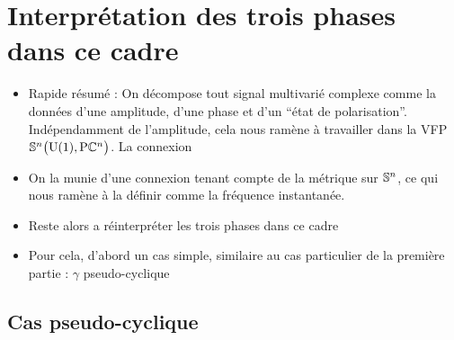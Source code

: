 \section{Interprétation des trois phases dans ce cadre} \label{sec:phases_dans_VFP}

\begin{itemize}
	
	\item Rapide résumé : On décompose tout signal multivarié complexe comme la données d'une amplitude, d'une phase et d'un ``état de polarisation''. Indépendamment de l'amplitude, cela nous ramène à travailler dans la VFP $\VFP$. La connexion 
	
	\item On la munie d'une connexion tenant compte de la métrique sur $\S{n}$, ce qui nous ramène à la définir comme la fréquence instantanée.
	
	\item Reste alors a réinterpréter les trois phases dans ce cadre
	
	\item Pour cela, d'abord un cas simple, similaire au cas particulier de la première partie : $\gamma$ pseudo-cyclique
\end{itemize}

\subsection{Cas pseudo-cyclique}

